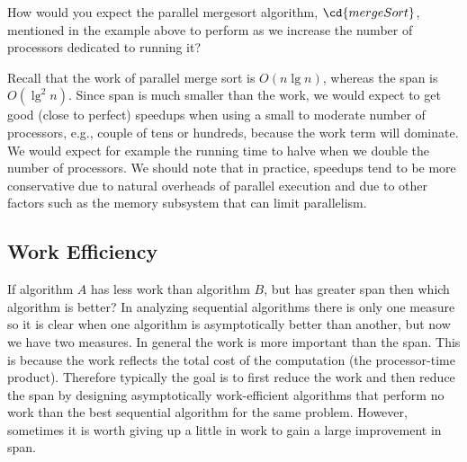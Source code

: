 \begin{flex}
\label{grp:xrcs:introduction::parallelism::would}

\begin{exercise}
\label{xrcs:introduction::parallelism::would}
How would you expect the parallel mergesort algorithm, $\cd{mergeSort}$,
mentioned in the example above to perform as we increase the number of
processors dedicated to running it?

\end{exercise}

\begin{solution}
\label{sol:introduction::parallelism::recall}
Recall that the work of parallel merge sort is $O(n\lg{n})$, whereas
the span is $O(\lg^2{n})$.  
Since span is much smaller than the work, we would expect to get good
(close to perfect) speedups when using a small to moderate number of
processors, e.g., couple of tens or hundreds, because the work term
will dominate.
We would expect for example the running time to halve when we double
the number of processors.
We should note that in practice, speedups tend to be more conservative
due to natural overheads of parallel execution and due to other
factors such as the memory subsystem that can limit parallelism. 

\end{solution}
\end{flex}


\subsection{Work Efficiency}
\label{sec:introduction::parallelism::work-efficiency}

\begin{cluster}
\label{grp:grm:introduction::parallelism::less}

\begin{gram}
\label{grm:introduction::parallelism::less}
If algorithm $A$ has less work than algorithm $B$, but has greater
span then which algorithm is better?  In analyzing sequential
algorithms there is only one measure so it is clear when one algorithm
is asymptotically better than another, but now we have two measures.
In general the work is more important than the span.  
This is because the work reflects the total cost of the computation
(the processor-time product).  Therefore typically the goal is to
first reduce the work and then reduce the span by designing
asymptotically work-efficient algorithms that perform no work
than the best sequential algorithm for the same problem. 
However, sometimes it is worth giving up a little in work to gain a
large improvement in span.

\end{gram}
\end{cluster}

